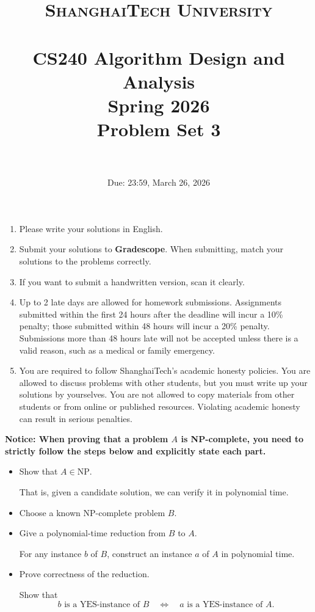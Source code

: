 \documentclass{article}
\title{
    \normalfont \normalsize
    \textsc{ShanghaiTech University} \\ [25pt]
    \horrule{0.5pt} \\[0.4cm] %
    \huge CS240 Algorithm Design and Analysis \\ %
    \LARGE Spring 2026\\
    \LARGE Problem Set 3\\
    \horrule{2pt} \\[0.5cm] %
}
\author{}
\date{Due: 23:59, March 26, 2026}
\begin{document}
\maketitle
\vspace{3ex}

\begin{enumerate}
\item Please write your solutions in English. 
\item Submit your solutions to \textbf{Gradescope}. When submitting, match your solutions to the
problems correctly.
\item If you want to submit a handwritten version, scan it clearly.
\item Up to 2 late days are allowed for homework submissions. Assignments submitted within the first 24 hours after the deadline will incur a 10\% penalty; those submitted within 48 hours will incur a 20\% penalty. Submissions more than 48 hours late will not be accepted unless there is a valid reason, such as a medical or family emergency.
\item You are required to follow ShanghaiTech's academic honesty policies. You are allowed to discuss problems with other students, but you must write up your solutions by yourselves. You are not allowed to copy materials from other students or from online or published resources. Violating academic honesty can result in serious penalties.  
\end{enumerate}

\newpage
\textbf{Notice: When proving that a problem $A$ is NP-complete, you need to strictly follow the steps below and explicitly state each part.}

\begin{itemize}
	\item Show that $A\in \mathrm{NP}$.
	
	That is, given a candidate solution, we can verify it in polynomial time.
	
	\item Choose a known NP-complete problem $B$.
	
	\item Give a polynomial-time reduction from $B$ to $A$.
	
	For any instance $b$ of $B$, construct an instance $a$ of $A$ in polynomial time.
	
	\item Prove correctness of the reduction.
	
	Show that
	\[
	b \text{ is a YES-instance of } B
	\quad\Longleftrightarrow\quad
	a \text{ is a YES-instance of } A.
	\]
\end{itemize}
\newpage









\end{document}
